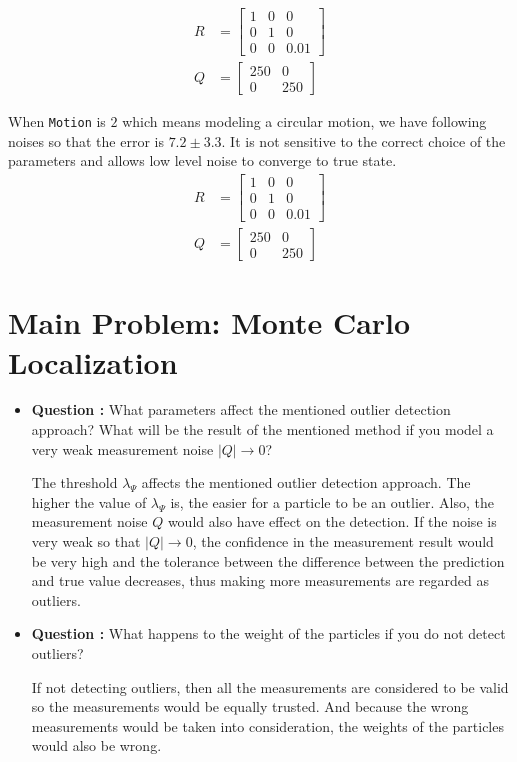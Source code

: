 \documentclass[11pt,a4paper]{article}
\begin{document}
\begin{itemize}
		\begin{align*}
			R &= \begin{bmatrix} 1 & 0 & 0 \\ 0 & 1 & 0 \\ 0 & 0 & 0.01 \end{bmatrix} \\
			Q &= \begin{bmatrix} 250 & 0 \\ 0 & 250 \end{bmatrix}
		\end{align*}
		\par When \texttt{Motion} is $2$ which means modeling a circular motion, we have following noises so that the error is $7.2 \pm 3.3$. It is not sensitive to the correct choice of the parameters and allows low level noise to converge to true state.
		\begin{align*}
			R &= \begin{bmatrix} 1 & 0 & 0 \\ 0 & 1 & 0 \\ 0 & 0 & 0.01 \end{bmatrix} \\
			Q &= \begin{bmatrix} 250 & 0 \\ 0 & 250 \end{bmatrix}
		\end{align*}
\end{itemize}

\section{Main Problem: Monte Carlo Localization}
\begin{itemize}
	\item\addtocounter{Counter}{1}\textbf{Question :} What parameters affect the mentioned outlier detection approach? What will be the result of the mentioned method if you model a very weak measurement noise $|Q| \rightarrow 0$?
		\par The threshold $\lambda_{\Psi}$ affects the mentioned outlier detection approach. The higher the value of $\lambda_{\Psi}$ is, the easier for a particle to be an outlier. Also, the measurement noise $Q$ would also have effect on the detection. If the noise is very weak so that $|Q| \rightarrow 0$, the confidence in the measurement result would be very high and the tolerance between the difference between the prediction and true value decreases, thus making more measurements are regarded as outliers. 

	\item\addtocounter{Counter}{1}\textbf{Question :} What happens to the weight of the particles if you do not detect outliers?
		\par If not detecting outliers, then all the measurements are considered to be valid so the measurements would be equally trusted. And because the wrong measurements would be taken into consideration, the weights of the particles would also be wrong.
\end{itemize}
\end{document}
